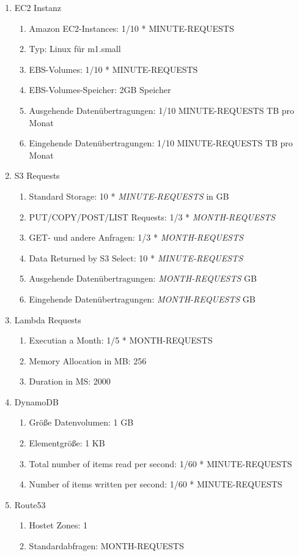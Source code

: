 \documentclass[a4paper, 12pt]{scrreprt}
\renewcommand\_{\textunderscore\allowbreak}
\begin{document}
\begin{enumerate}
	\item EC2 Instanz
	\begin{enumerate}
		\item Amazon EC2-Instances: 1/10 * MINUTE-REQUESTS
		\item Typ: Linux für m1.small
		\item EBS-Volumes: 1/10 * MINUTE-REQUESTS
		\item EBS-Volumes-Speicher: 2GB Speicher
		\item Ausgehende Datenübertragungen: 1/10 MINUTE-REQUESTS TB pro Monat
		\item Eingehende Datenübertragungen: 1/10 MINUTE-REQUESTS TB pro Monat
	\end{enumerate}
	\item S3 Requests
	\begin{enumerate}
		\item Standard Storage: 10 * \textit{MINUTE-REQUESTS} in GB
		\item PUT/COPY/POST/LIST Requests: 1/3 * \textit{MONTH-REQUESTS}
		\item GET- und andere Anfragen: 1/3 * \textit{MONTH-REQUESTS}
		\item Data Returned by S3 Select: 10 * \textit{MINUTE-REQUESTS}
		\item Ausgehende Datenübertragungen: \textit{MONTH-REQUESTS} GB
		\item Eingehende Datenübertragungen: \textit{MONTH-REQUESTS} GB
	\end{enumerate}
	\item Lambda Requests
	\begin{enumerate}
		\item Executian a Month: 1/5 * MONTH-REQUESTS
		\item Memory Allocation in MB: 256
		\item Duration in MS: 2000
	\end{enumerate}
	\item DynamoDB
	\begin{enumerate}
		\item Größe Datenvolumen: 1 GB
		\item Elementgröße: 1 KB
		\item Total number of items read per second: 1/60 * MINUTE-REQUESTS
		\item Number of items written per second: 1/60 * MINUTE-REQUESTS
	\end{enumerate}
	\item Route53
	\begin{enumerate}
		\item Hostet Zones: 1
		\item Standardabfragen: MONTH-REQUESTS
	\end{enumerate}
\end{enumerate}
\end{document}
